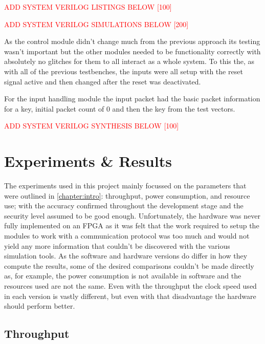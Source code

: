 \documentclass[12pt,twoside,a4paper]{report}
\begin{document}
	\textcolor{red}{ADD SYSTEM VERILOG LISTINGS BELOW [100]}
    
	\textcolor{red}{ADD SYSTEM VERILOG SIMULATIONS BELOW [200]}
	
	As the control module didn't change much from the previous approach its testing wasn't important but the other modules needed to be functionality correctly with absolutely no glitches for them to all interact as a whole system. To this the, as with all of the previous testbenches, the inputs were all setup with the reset signal active and then changed after the reset was deactivated.

	For the input handling module the input packet had the basic packet information for a key, initial packet count of $0$ and then the key from the test vectors.

	\textcolor{red}{ADD SYSTEM VERILOG SYNTHESIS BELOW [100]}

	\chapter{Experiments \& Results}
	\label{chapter:RESULT}
	
	The experiments used in this project mainly focussed on the parameters that were outlined in \autoref{chapter:intro}: throughput, power consumption, and resource use; with the accuracy confirmed throughout the development stage and the security level assumed to be good enough. Unfortunately, the hardware was never fully implemented on an FPGA as it was felt that the work required to setup the modules to work with a communication protocol was too much and would not yield any more information that couldn't be discovered  with the various simulation tools. As the software and hardware versions do differ in how they compute the results, some of the desired comparisons couldn't be made directly as, for example, the power consumption is not available in software and the resources used are not the same. Even with the throughput the clock speed used in each version is vastly different, but even with that disadvantage the hardware should perform better.
	
	\section{Throughput}
	
\end{document}
